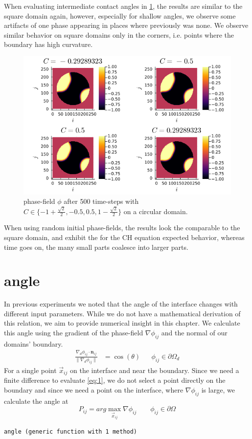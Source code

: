 \documentclass{mimosis}
\begin{document}
When evaluating intermediate contact angles in \ref{fig:angle-multiplec}, the results are similar to the square domain again, however, especially for shallow angles, we observe some artifacts of one phase appearing in places where previously was none. We observe similar behavior on square domains only in the corners, i.e. points where the boundary has high curvature.
\begin{figure}[htbp]
\centering
\includegraphics[width=.9\linewidth]{images/angle-multiplec.png}
\caption{\label{fig:angle-multiplec}phase-field \(\phi\) after 500 time-steps with \(C \in \{-1 + \frac{\sqrt{2}}{2} , -0.5 , 0.5 , 1 - \frac{\sqrt{2}}{2} \}\) on a circular domain.}
\end{figure}



When using random initial phase-fields, the results look the comparable to the square domain, and exhibit the for the CH equation expected behavior, whereas time goes on, the many small parts coalesce into larger parts.
\chapter{angle}
\label{sec:org694a480}
In previous experiments we noted that the angle of the interface changes with different input parameters. While we do not have a mathematical derivation of this relation, we aim to provide numerical insight in this chapter. We calculate this angle using the gradient of the phase-field \(\nabla \phi_{ij}\) and the normal of our domains' boundary.
\begin{align}
\label{eq:1}
\frac{\nabla_d \phi_{ij} \cdot \mathbf{n}_{ij}}{\|\nabla_{d} \phi_{ij}\|} &= \cos(\theta)& & \phi_{ij} \in \partial\Omega_{d}
\end{align}
For a single point \(\vec{x}_{ij}\) on the interface and near the boundary. Since we need a finite difference to evaluate \ref{eq:1}, we do not select a point directly on the boundary and since we need a point on the interface, where \(\nabla \phi_{ij}\) is large, we calculate the angle at
\begin{equation}
\label{eq:2}
P_{ij} = arg\max_{\vec{x}_{ij}} \nabla \phi_{ij} \qquad \phi_{ij} \in \partial \Omega
\end{equation}
\label{angle-function}
\begin{verbatim}
angle (generic function with 1 method)
\end{verbatim}
\end{document}
